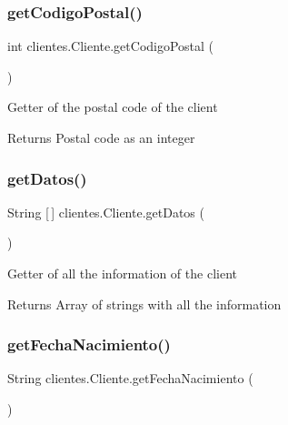 \subsubsection{\texorpdfstring{get\+Codigo\+Postal()}{getCodigoPostal()}}
{\footnotesize\ttfamily int clientes.\+Cliente.\+get\+Codigo\+Postal (\begin{DoxyParamCaption}{ }\end{DoxyParamCaption})\hspace{0.3cm}{\ttfamily [inline]}}

Getter of the postal code of the client

\begin{DoxyReturn}{Returns}
Postal code as an integer 
\end{DoxyReturn}
\mbox{\label{classclientes_1_1_cliente_a3fe03993034c7fd7ca5a3433a3543508}} 
\subsubsection{\texorpdfstring{get\+Datos()}{getDatos()}}
{\footnotesize\ttfamily String \mbox{[}$\,$\mbox{]} clientes.\+Cliente.\+get\+Datos (\begin{DoxyParamCaption}{ }\end{DoxyParamCaption})\hspace{0.3cm}{\ttfamily [inline]}}

Getter of all the information of the client

\begin{DoxyReturn}{Returns}
Array of strings with all the information 
\end{DoxyReturn}
\mbox{\label{classclientes_1_1_cliente_a81caceaa663e94f828969a0ecfb63730}} 
\subsubsection{\texorpdfstring{get\+Fecha\+Nacimiento()}{getFechaNacimiento()}}
{\footnotesize\ttfamily String clientes.\+Cliente.\+get\+Fecha\+Nacimiento (\begin{DoxyParamCaption}{ }\end{DoxyParamCaption})\hspace{0.3cm}{\ttfamily [inline]}}

